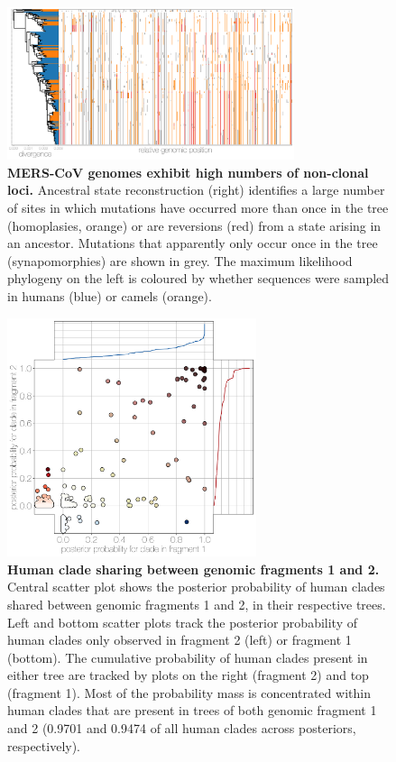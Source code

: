 \documentclass[11pt,oneside,letterpaper]{article}
\begin{document}
\begin{figure}[h]
\centering
	\includegraphics[width=0.75\textwidth]{figures/mers_incompatibilities.png}
	\caption{\textbf{MERS-CoV genomes exhibit high numbers of non-clonal loci.}
Ancestral state reconstruction (right) identifies a large number of sites in which mutations have occurred more than once in the tree (homoplasies, orange) or are reversions (red) from a state arising in an ancestor.
Mutations that apparently only occur once in the tree (synapomorphies) are shown in grey.
The maximum likelihood phylogeny on the left is coloured by whether sequences were sampled in humans (blue) or camels (orange).
	}
	\label{incompatibilities}
\end{figure}

\begin{figure}[h]
\centering
	\includegraphics[width=0.65\textwidth]{figures/mers_flower.png}
	\caption{\textbf{Human clade sharing between genomic fragments 1 and 2.}
Central scatter plot shows the posterior probability of human clades shared between genomic fragments 1 and 2, in their respective trees.
Left and bottom scatter plots track the posterior probability of human clades only observed in fragment 2 (left) or fragment 1 (bottom).
The cumulative probability of human clades present in either tree are tracked by plots on the right (fragment 2) and top (fragment 1).
Most of the probability mass is concentrated within human clades that are present in trees of both genomic fragment 1 and 2 (0.9701 and 0.9474 of all human clades across posteriors, respectively).
	}
	\label{flower}
\end{figure}
\end{document}
